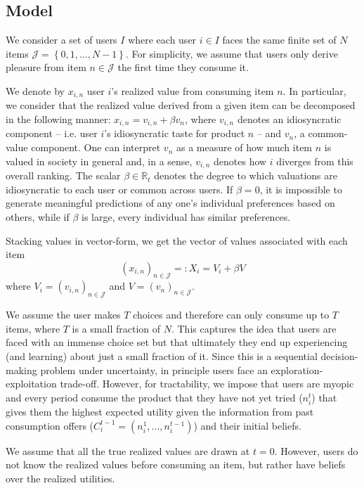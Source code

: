 \documentclass[format=acmsmall, review=false]{acmart}
\newcommand{\xhdr}[1]{\vspace{1mm} \noindent{\bf #1}}
\begin{document}
\subsection{Model}
\par
\xhdr{Users.} We consider a set of users $I$ where each user $i \in I$ faces the same finite set of $N$ items $\mathcal J = \left\{0,1,...,N-1\right\}$. For simplicity, we assume that users only derive pleasure from item $n \in \mathcal{J}$ the first time they consume it.
\par

We denote by $x_{i,n}$ user $i$'s realized value from consuming item $n$. In particular, we consider that the realized value derived from a given item can be decomposed in the following manner: $x_{i,n}= v_{i,n} + \beta v_n$, where $v_{i,n}$ denotes an idiosyncratic component -- i.e. user $i$'s idiosyncratic taste for product $n$ --  and $v_{n}$, a common-value component. One can interpret $v_n$ as a measure of how much item $n$ is valued in society in general and, in a sense, $v_{i,n}$ denotes how $i$ diverges from this overall ranking. The scalar $\beta \in \mathbb{R}_{t}$ denotes the degree to which valuations are idiosyncratic to each user or common across users. If $\beta=0$, it is impossible to generate meaningful predictions of any one's individual preferences based on others, while if $\beta$ is large, every individual has similar preferences.
\par
Stacking values in vector-form, we get the vector of values associated with each item 
$${\left(x_{i,n}\right)}_{n \in \mathcal{J}}=:X_i =V_i+ \beta V $$
where $V_i ={\left(v_{i,n}\right)}_{n \in \mathcal{J}}$ and $V={\left(v_{n}\right)}_{n \in \mathcal{J}}$.
\par
\xhdr{User Decision-Making.}
We assume the user makes $T$ choices and therefore can only consume up to $T$ items, where $T$ is a small fraction of $N$. This captures the idea that users are faced with an immense choice set but that ultimately they end up experiencing (and learning) about just a small fraction of it. Since this is a sequential decision-making problem under uncertainty, in principle users face an exploration-exploitation trade-off. However, for tractability, we impose that users are myopic and every period consume the product that they have not yet tried ($n_i^t$) that gives them the highest expected utility given the information from past consumption offers ($C_i^{t-1}=(n_i^1,...,n_i^{t-1})$) and their initial beliefs.
\par
\xhdr{User Beliefs.} We assume that all the true realized values are drawn at $t = 0$. However, users do not know the realized values before consuming an item, but rather have beliefs over the realized utilities.
\end{document}
